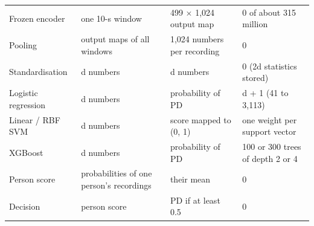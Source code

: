 \documentclass[11pt,a4paper]{article}
\begin{document}
\begin{center}
\begin{longtable}{>{\raggedright\arraybackslash}p{3.08cm}>{\raggedright\arraybackslash}p{4.04cm}>{\raggedright\arraybackslash}p{4.23cm}>{\raggedright\arraybackslash}p{3.46cm}}
\hspace{0pt}Frozen encoder & \hspace{0pt}one 10-s window & \hspace{0pt}499 $\times$ 1,024 output map & \hspace{0pt}0 of about 315 million\\
\hspace{0pt}Pooling & \hspace{0pt}output maps of all windows & \hspace{0pt}1,024 numbers per recording & \hspace{0pt}0\\
\hspace{0pt}Standardisation & \hspace{0pt}d numbers & \hspace{0pt}d numbers & \hspace{0pt}0 (2d statistics stored)\\
\hspace{0pt}Logistic regression & \hspace{0pt}d numbers & \hspace{0pt}probability of PD & \hspace{0pt}d +\allowbreak{} 1 (41 to 3,113)\\
\hspace{0pt}Linear /\allowbreak{} RBF SVM & \hspace{0pt}d numbers & \hspace{0pt}score mapped to (0, 1) & \hspace{0pt}one weight per support vector\\
\hspace{0pt}XGBoost & \hspace{0pt}d numbers & \hspace{0pt}probability of PD & \hspace{0pt}100 or 300 trees of depth 2 or 4\\
\hspace{0pt}Person score & \hspace{0pt}probabilities of one person's recordings & \hspace{0pt}their mean & \hspace{0pt}0\\
\hspace{0pt}Decision & \hspace{0pt}person score & \hspace{0pt}PD if at least 0.5 & \hspace{0pt}0\\
\end{longtable}\end{center}
\end{document}
